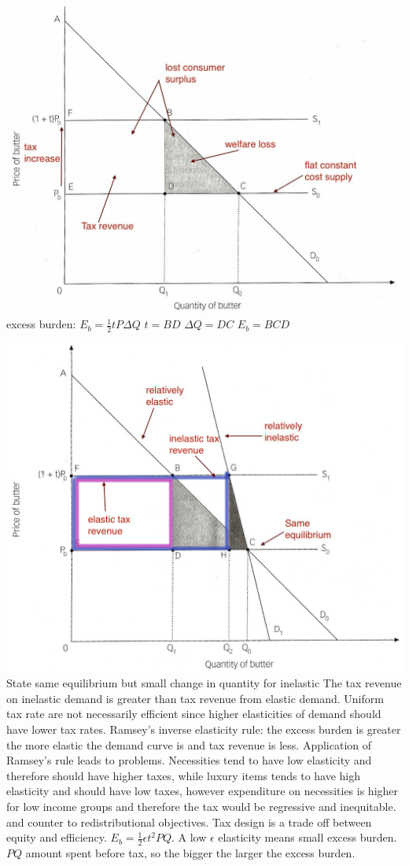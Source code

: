\documentclass[12pt]{examnotes}
\begin{document}
\includegraphics[scale=0.3]{./imgs/112.jpg}
\ra excess burden: $E_b=\frac{1}{2}tP\Delta Q$ \quad$t=BD$ \quad $\Delta Q=DC$ \quad $E_b=BCD$

\includegraphics[scale=0.3]{./imgs/113.jpg}
\ra State same equilibrium but small change in quantity for inelastic
\ra The tax revenue on inelastic demand is greater than tax revenue from elastic demand.
\ra Uniform tax rate are not necessarily efficient since higher elasticities of demand should have lower tax rates.
\ra Ramsey's inverse elasticity rule: the excess burden is greater the more elastic the demand curve is and tax revenue is less.
\ra Application of Ramsey's rule leads to problems. Necessities tend to have low elasticity and therefore should have higher taxes, while luxury items tends to have high elasticity and should have low taxes, however expenditure on necessities is higher for low income groups and therefore the tax would be regressive and inequitable. and counter to redistributional objectives.
\ra Tax design is a trade off between equity and efficiency.
\ra $E_b=\frac{1}{2}\epsilon t^2 PQ$. A low $\epsilon$ elasticity means small excess burden. $PQ$ amount spent before tax, so the bigger the larger the excess burden. 
\end{document}
